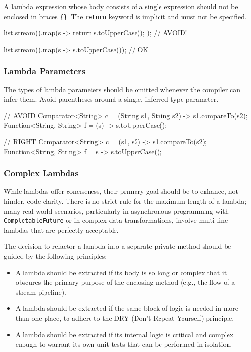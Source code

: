 \documentclass{article}
\begin{document}
A lambda expression whose body consists of a single expression should not be enclosed in braces
\texttt{\{\}}. The \texttt{return} keyword is implicit and must not be specified.

\begin{snippet}
list.stream().map(s -> { return s.toUpperCase(); }); // AVOID!

list.stream().map(s -> s.toUpperCase());             // OK
\end{snippet}

\subsubsection{Lambda Parameters}

The types of lambda parameters should be omitted whenever the compiler can infer them. Avoid
parentheses around a single, inferred-type parameter.

\begin{snippet}
// AVOID
Comparator<String> c = (String s1, String s2) -> s1.compareTo(s2);
Function<String, String> f = (s) -> s.toUpperCase();

// RIGHT
Comparator<String> c = (s1, s2) -> s1.compareTo(s2);
Function<String, String> f = s -> s.toUpperCase();
\end{snippet}

\subsubsection{Complex Lambdas}

While lambdas offer conciseness, their primary goal should be to enhance, not hinder, code clarity.
There is no strict rule for the maximum length of a lambda; many real-world scenarios, particularly
in asynchronous programming with \texttt{CompletableFuture} or in complex data transformations,
involve multi-line lambdas that are perfectly acceptable.

The decision to refactor a lambda into a separate private method should be guided by the following
principles:

\begin{itemize}
\item A lambda should be extracted if its body is so long or complex that it obscures the primary
  purpose of the enclosing method (e.g., the flow of a stream pipeline).
\item A lambda should be extracted if the same block of logic is needed in more than one place, to
  adhere to the DRY (Don't Repeat Yourself) principle.
\item A lambda should be extracted if its internal logic is critical and complex enough to warrant
  its own unit tests that can be performed in isolation.
\end{itemize}
\end{document}

